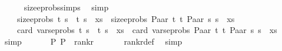 \begin{isabellebody}
\ \ \ \ \isamarkupfalse%
\ size{\isacharunderscore}{\kern0pt}eprobs{\isachardot}{\kern0pt}simps\ \isamarkupfalse%
\ simp\isanewline
\ \ \isamarkupfalse%
\ \isamarkupfalse%
\ \isanewline
\ \ \ \ {\isachardoublequoteopen}size{\isacharunderscore}{\kern0pt}eprobs\ {\isacharparenleft}{\kern0pt}{\isacharparenleft}{\kern0pt}t{}{\isacharcomma}{\kern0pt}\ s{}{\isacharparenright}{\kern0pt}\ {\isacharhash}{\kern0pt}\ {\isacharparenleft}{\kern0pt}t{}{\isacharcomma}{\kern0pt}\ s{}{\isacharparenright}{\kern0pt}\ {\isacharhash}{\kern0pt}\ xs{\isacharparenright}{\kern0pt}\ {\isacharless}{\kern0pt}\ size{\isacharunderscore}{\kern0pt}eprobs\ {\isacharparenleft}{\kern0pt}{\isacharparenleft}{\kern0pt}Paar\ t{}\ t{}{\isacharcomma}{\kern0pt}\ Paar\ s{}\ s{}{\isacharparenright}{\kern0pt}\ {\isacharhash}{\kern0pt}\ xs{\isacharparenright}{\kern0pt}{\isachardoublequoteclose}\isanewline
\ \ \ \ {\isachardoublequoteopen}card\ {\isacharparenleft}{\kern0pt}vars{\isacharunderscore}{\kern0pt}eprobs\ {\isacharparenleft}{\kern0pt}{\isacharparenleft}{\kern0pt}t{}{\isacharcomma}{\kern0pt}\ s{}{\isacharparenright}{\kern0pt}\ {\isacharhash}{\kern0pt}\ {\isacharparenleft}{\kern0pt}t{}{\isacharcomma}{\kern0pt}\ s{}{\isacharparenright}{\kern0pt}\ {\isacharhash}{\kern0pt}\ xs{\isacharparenright}{\kern0pt}{\isacharparenright}{\kern0pt}\ {\isacharequal}{\kern0pt}\ card\ {\isacharparenleft}{\kern0pt}vars{\isacharunderscore}{\kern0pt}eprobs\ {\isacharparenleft}{\kern0pt}{\isacharparenleft}{\kern0pt}Paar\ t{}\ t{}{\isacharcomma}{\kern0pt}\ Paar\ s{}\ s{}{\isacharparenright}{\kern0pt}\ {\isacharhash}{\kern0pt}\ xs{\isacharparenright}{\kern0pt}{\isacharparenright}{\kern0pt}{\isachardoublequoteclose}\isanewline
\ \ \ \ \isamarkupfalse%
\ simp{\isacharplus}{\kern0pt}\isanewline
\ \ \isamarkupfalse%
\ {}\ \isamarkupfalse%
\ {\isachardoublequoteopen}{\isacharparenleft}{\kern0pt}P{}{\isacharcomma}{\kern0pt}\ P{}{\isacharparenright}{\kern0pt}\ {\isasymin}\ rank{\isacharunderscore}{\kern0pt}r{\isachardoublequoteclose}\ \isanewline
\ \ \ \ \isamarkupfalse%
\ rank{\isacharunderscore}{\kern0pt}r{\isacharunderscore}{\kern0pt}def\ \isamarkupfalse%
\ simp\isanewline
{}\isamarkupfalse%

\end{isabellebody}
